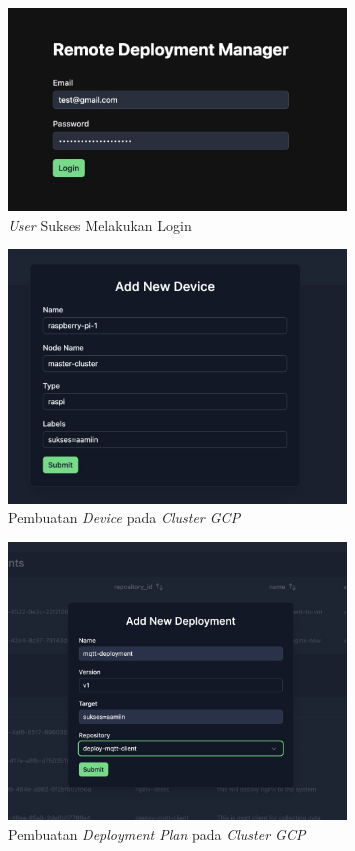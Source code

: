 \begin{figure}[ht]
  \centering
  \includegraphics[width=0.8\textwidth]{resources/chapter-4/pengujian/pengujian-sistem-gcp-03.jpg}
  \caption{\textit{User} Sukses Melakukan Login}
  \label{fig:pengujian-sistem-gcp-03}
\end{figure}

\begin{figure}[ht]
  \centering
  \includegraphics[width=0.8\textwidth]{resources/chapter-4/pengujian/pengujian-sistem-gcp-04.jpg}
  \caption{Pembuatan \textit{Device} pada \textit{Cluster GCP}}
  \label{fig:pengujian-sistem-gcp-04}
\end{figure}

\begin{figure}[ht]
  \centering
  \includegraphics[width=0.8\textwidth]{resources/chapter-4/pengujian/pengujian-sistem-gcp-05.jpg}
  \caption{Pembuatan \textit{Deployment Plan} pada \textit{Cluster GCP}}
  \label{fig:pengujian-sistem-gcp-05}
\end{figure}


